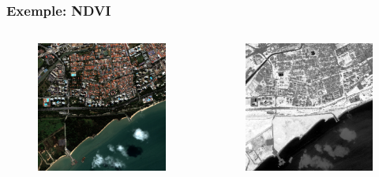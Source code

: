 \documentclass[compress]{beamer}
\begin{document}
\begin{frame}
\frametitle{Exemple: NDVI}
\begin{columns}
\begin{column}{0.5\textwidth}
\begin{figure}[]
  \includegraphics[width=1.0\textwidth]{radio2-extract-3b.jpg}
\end{figure}
\end{column}
\begin{column}{0.5\textwidth}
\begin{figure}[]
  \includegraphics[width=1.0\textwidth]{Radiometry-NDVI.jpg}
\end{figure}
\end{column}
\end{columns}
\end{frame}
\end{document}
